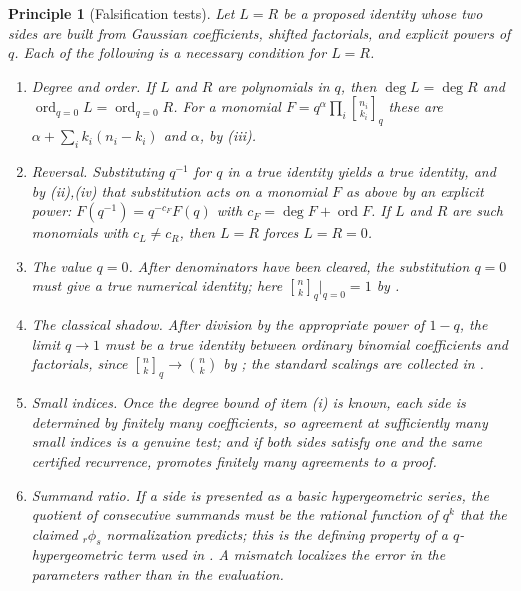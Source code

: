 \documentclass[11pt,oneside,openany]{book}
\newtheorem{principle}[principle]{Principle}
\theoremstyle{definition}
\theoremstyle{remark}
\newcommand{\qbinom}[2]{\genfrac{[}{]}{0pt}{}{#1}{#2}_{q}}
\newcommand{\ord}{\operatorname{ord}}
\begin{document}
\begin{principle}[Falsification tests]\label{prin:identity-tests}
Let $L=R$ be a proposed identity whose two sides are built from Gaussian
coefficients, shifted factorials, and explicit powers of $q$.  Each of the
following is a necessary condition for $L=R$.
\begin{enumerate}
\item \emph{Degree and order.}  If $L$ and $R$ are polynomials in $q$, then
 $\deg L=\deg R$ and $\ord_{q=0}L=\ord_{q=0}R$.  For a monomial
 $F=q^{\alpha}\prod_i\qbinom{n_i}{k_i}$ these are
 $\alpha+\sum_ik_i(n_i-k_i)$ and $\alpha$, by
 (iii).
\item \emph{Reversal.}  Substituting $q^{-1}$ for $q$ in a true identity
 yields a true identity, and by (ii),(iv) that
 substitution acts on a monomial $F$ as above by an explicit power:
 $F(q^{-1})=q^{-c_F}F(q)$ with $c_F=\deg F+\ord F$.  If $L$ and $R$ are such
 monomials with $c_L\ne c_R$, then $L=R$ forces $L=R=0$.
\item \emph{The value $q=0$.}  After denominators have been cleared, the
 substitution $q=0$ must give a true numerical identity; here
 $\qbinom nk\big|_{q=0}=1$ by .
\item \emph{The classical shadow.}  After division by the appropriate power
 of $1-q$, the limit $q\to1$ must be a true identity between ordinary
 binomial coefficients and factorials, since $\qbinom nk\to\binom nk$ by
 ; the standard scalings are collected in
 .
\item \emph{Small indices.}  Once the degree bound of item (i) is known, each
 side is determined by finitely many coefficients, so agreement at
 sufficiently many small indices is a genuine test; and if both sides satisfy
 one and the same certified recurrence, 
 promotes finitely many agreements to a proof.
\item \emph{Summand ratio.}  If a side is presented as a basic hypergeometric
 series, the quotient of consecutive summands must be the rational function
 of $q^k$ that the claimed ${}_r\phi_s$ normalization predicts; this is the
 defining property of a $q$-hypergeometric term used in
 .  A mismatch localizes the error in the
 parameters rather than in the evaluation.
\end{enumerate}
\end{principle}
\end{document}
